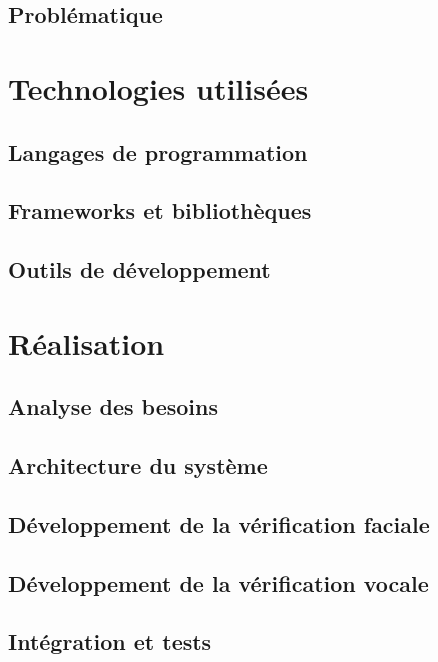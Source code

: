 \documentclass[12pt,a4paper]{report}
\begin{document}
\section{Problématique}

\chapter{Technologies utilisées}
\section{Langages de programmation}

\section{Frameworks et bibliothèques}

\section{Outils de développement}

\chapter{Réalisation}
\section{Analyse des besoins}

\section{Architecture du système}

\section{Développement de la vérification faciale}

\section{Développement de la vérification vocale}

\section{Intégration et tests}
\end{document}
